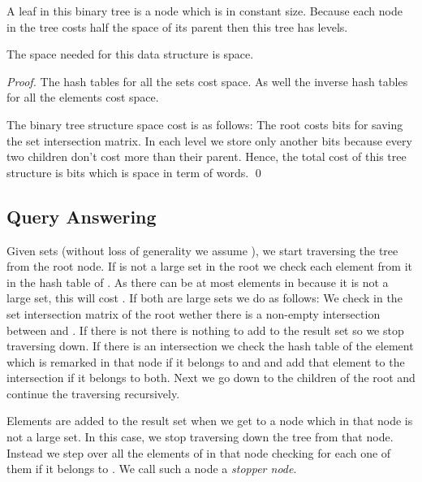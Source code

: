 \documentclass[10pt]{llncs}
\begin{document}
A leaf in this binary tree is a node which is in constant size.
Because each node in the tree costs half the space of its parent then this tree has  levels.

\begin{theorem}
The space needed for this data structure is  space.
\end{theorem}
\begin{proof}
The hash tables for all the sets cost  space.
As well the inverse hash tables for all the elements cost  space.

The binary tree structure space cost is as follows:
The root costs  bits for saving the set intersection matrix.
In each level we store only another  bits because every two children don't cost more than their parent.
Hence, the total cost of this tree structure is  bits
which is  space in term of words.
\qed
\end{proof}

\subsection{Query Answering}
Given sets  (without loss of generality we assume ),
we start traversing the tree from the root node.
If  is not a large set in the root we check each element from it in the hash table of .
As there can be at most  elements in  because it is not a large set,
this will cost .
If both  are large sets we do as follows:
We check in the set intersection matrix of the root wether there is a non-empty intersection between  and .
If there is not
there is nothing to add to the result set so we stop traversing down.
If there is an intersection
we check the hash table of the element which is remarked in that node if it belongs to  and 
and add that element to the intersection if it belongs to both.
Next we go down to the children of the root and continue the traversing recursively.

Elements are added to the result set when we get to a node
which in that node  is not a large set.
In this case, we stop traversing down the tree from that node.
Instead we step over all the elements of  in that node checking for each one of them
if it belongs to .
We call such a node a \emph{stopper node}.
\end{document}
